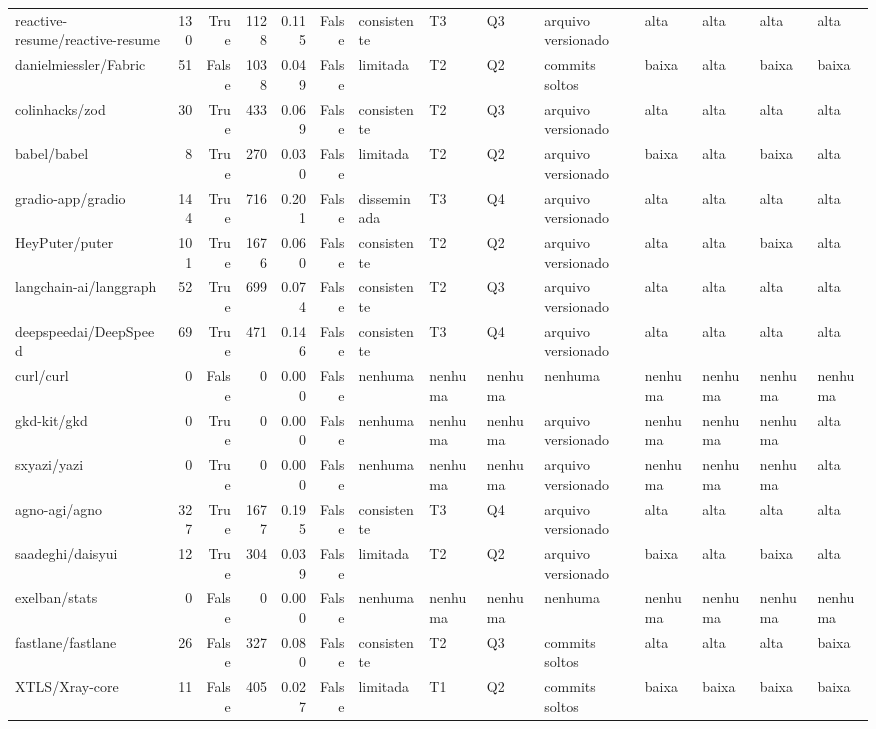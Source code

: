 \begin{tabular}{lrrrrrllllllll}
reactive-resume/reactive-resume & 130 & True & 1128 & 0.115 & False & consistente & T3 & Q3 & arquivo versionado & alta & alta & alta & alta \\
danielmiessler/Fabric & 51 & False & 1038 & 0.049 & False & limitada & T2 & Q2 & commits soltos & baixa & alta & baixa & baixa \\
colinhacks/zod & 30 & True & 433 & 0.069 & False & consistente & T2 & Q3 & arquivo versionado & alta & alta & alta & alta \\
babel/babel & 8 & True & 270 & 0.030 & False & limitada & T2 & Q2 & arquivo versionado & baixa & alta & baixa & alta \\
gradio-app/gradio & 144 & True & 716 & 0.201 & False & disseminada & T3 & Q4 & arquivo versionado & alta & alta & alta & alta \\
HeyPuter/puter & 101 & True & 1676 & 0.060 & False & consistente & T2 & Q2 & arquivo versionado & alta & alta & baixa & alta \\
langchain-ai/langgraph & 52 & True & 699 & 0.074 & False & consistente & T2 & Q3 & arquivo versionado & alta & alta & alta & alta \\
deepspeedai/DeepSpeed & 69 & True & 471 & 0.146 & False & consistente & T3 & Q4 & arquivo versionado & alta & alta & alta & alta \\
curl/curl & 0 & False & 0 & 0.000 & False & nenhuma & nenhuma & nenhuma & nenhuma & nenhuma & nenhuma & nenhuma & nenhuma \\
gkd-kit/gkd & 0 & True & 0 & 0.000 & False & nenhuma & nenhuma & nenhuma & arquivo versionado & nenhuma & nenhuma & nenhuma & alta \\
sxyazi/yazi & 0 & True & 0 & 0.000 & False & nenhuma & nenhuma & nenhuma & arquivo versionado & nenhuma & nenhuma & nenhuma & alta \\
agno-agi/agno & 327 & True & 1677 & 0.195 & False & consistente & T3 & Q4 & arquivo versionado & alta & alta & alta & alta \\
saadeghi/daisyui & 12 & True & 304 & 0.039 & False & limitada & T2 & Q2 & arquivo versionado & baixa & alta & baixa & alta \\
exelban/stats & 0 & False & 0 & 0.000 & False & nenhuma & nenhuma & nenhuma & nenhuma & nenhuma & nenhuma & nenhuma & nenhuma \\
fastlane/fastlane & 26 & False & 327 & 0.080 & False & consistente & T2 & Q3 & commits soltos & alta & alta & alta & baixa \\
XTLS/Xray-core & 11 & False & 405 & 0.027 & False & limitada & T1 & Q2 & commits soltos & baixa & baixa & baixa & baixa \\

\end{tabular}

